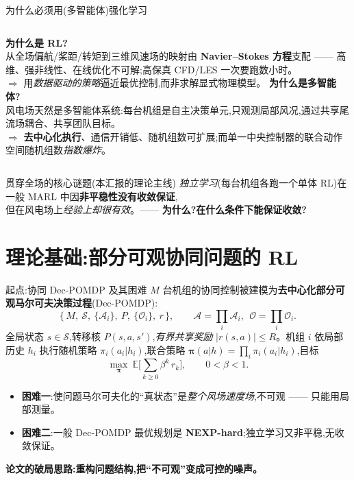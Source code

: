 \documentclass[aspectratio=169,11pt,UTF8]{ctexbeamer}
\newcommand{\E}{\mathbb{E}}
\newcommand{\calS}{\mathcal{S}}
\newcommand{\calA}{\mathcal{A}}
\newcommand{\calO}{\mathcal{O}}
\newcommand{\bpi}{\bm{\pi}}
\newcommand{\emphb}[1]{\textcolor{myred}{\textbf{#1}}}
\newcommand{\emphg}[1]{\textcolor{mygreen}{\textbf{#1}}}
\begin{document}
\begin{frame}{为什么必须用(多智能体)强化学习}
\small
\begin{columns}[T]
\textbf{为什么是 RL?}\\
从全场偏航/桨距/转矩到三维风速场的映射由 \emphb{Navier--Stokes 方程}支配 —— 高维、强非线性、在线优化不可解;高保真 CFD/LES 一次要跑数小时。\\[2pt]
$\Rightarrow$ 用\emph{数据驱动的策略}逼近最优控制,而非求解显式物理模型。
\textbf{为什么是多智能体?}\\
风电场天然是多智能体系统:每台机组是自主决策单元,只观测局部风况,通过共享尾流场耦合、共享团队目标。\\[2pt]
$\Rightarrow$ \emphg{去中心化执行}、通信开销低、随机组数可扩展;而单一中央控制器的联合动作空间随机组数\emph{指数爆炸}。
\end{columns}
\vspace{2mm}
\begin{alertblock}{贯穿全场的核心谜题(本汇报的理论主线)}
\centering
\emph{独立学习}(每台机组各跑一个单体 RL)在一般 MARL 中因\emphb{非平稳性}\textbf{没有收敛保证},\\
但在风电场上\emph{经验上却很有效}。—— \textbf{为什么?在什么条件下能保证收敛?}
\end{alertblock}
\end{frame}

\section{理论基础:部分可观协同问题的 RL}

\begin{frame}{起点:协同 Dec-POMDP 及其困难}
\small
$M$ 台机组的协同控制被建模为\emphb{去中心化部分可观马尔可夫决策过程}(Dec-POMDP):
\[
\big\{\,M,\ \calS,\ \{\calA_i\},\ P,\ \{\calO_i\},\ r\,\big\},\qquad
\calA=\textstyle\prod_i\calA_i,\ \ \calO=\prod_i\calO_i.
\]
全局状态 $s\in\calS$,转移核 $P(s,a,s')$,\emph{有界共享奖励} $|r(s,a)|\le R$。机组 $i$ 依局部历史 $h_i$ 执行随机策略 $\pi_i(a_i|h_i)$,联合策略 $\bpi(a|h)=\prod_i\pi_i(a_i|h_i)$,目标
\[
\max_{\bpi}\ \E\Big[\sum_{k\ge0}\beta^k\,r_k\Big],\qquad 0<\beta<1.
\]
\begin{itemize}\setlength\itemsep{2pt}
  \item \emphb{困难一}:使问题马尔可夫化的“真状态”是\emph{整个风场速度场},不可观 —— 只能用局部测量。
  \item \emphb{困难二}:一般 Dec-POMDP 最优规划是 \textbf{NEXP-hard};独立学习又非平稳,无收敛保证。
\end{itemize}
\centering\vspace{1mm}
\emphg{论文的破局思路:重构问题结构,把“不可观”变成可控的噪声。}
\end{frame}
\end{document}
